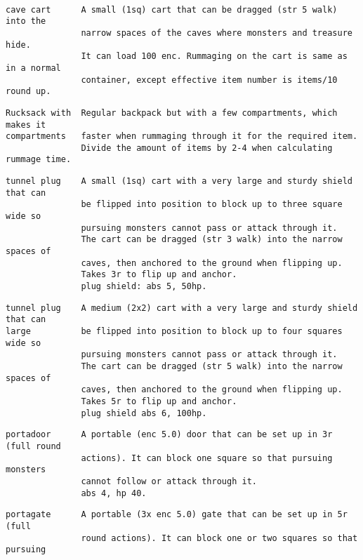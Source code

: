 \

\small \begin{samepage} \begin{verbatim}
cave cart      A small (1sq) cart that can be dragged (str 5 walk) into the
               narrow spaces of the caves where monsters and treasure hide.
               It can load 100 enc. Rummaging on the cart is same as in a normal
               container, except effective item number is items/10 round up.
\end{verbatim} \blocklistgap \begin{verbatim}
Rucksack with  Regular backpack but with a few compartments, which makes it
compartments   faster when rummaging through it for the required item.
               Divide the amount of items by 2-4 when calculating rummage time.
\end{verbatim} \blocklistgap \begin{verbatim}
tunnel plug    A small (1sq) cart with a very large and sturdy shield that can
               be flipped into position to block up to three square wide so
               pursuing monsters cannot pass or attack through it.
               The cart can be dragged (str 3 walk) into the narrow spaces of
               caves, then anchored to the ground when flipping up.
               Takes 3r to flip up and anchor.
               plug shield: abs 5, 50hp.
\end{verbatim} \blocklistgap \begin{verbatim}
tunnel plug    A medium (2x2) cart with a very large and sturdy shield that can
large          be flipped into position to block up to four squares wide so
               pursuing monsters cannot pass or attack through it.
               The cart can be dragged (str 5 walk) into the narrow spaces of
               caves, then anchored to the ground when flipping up.
               Takes 5r to flip up and anchor.
               plug shield abs 6, 100hp.
\end{verbatim} \blocklistgap \begin{verbatim}
portadoor      A portable (enc 5.0) door that can be set up in 3r (full round
               actions). It can block one square so that pursuing monsters
               cannot follow or attack through it.
               abs 4, hp 40.
\end{verbatim} \blocklistgap \begin{verbatim}
portagate      A portable (3x enc 5.0) gate that can be set up in 5r (full
               round actions). It can block one or two squares so that pursuing

\end{verbatim}
\end{samepage}
